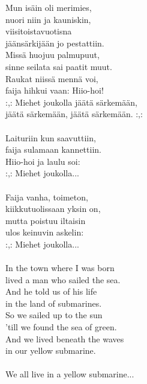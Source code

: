 
Mun isäin oli merimies, \\ nuori niin ja kauniskin, \\ viisitoistavuotisna \\ jäänsärkijään jo pestattiin. \\ Missä huojuu palmupuut, \\ sinne seilata sai paatit muut. \\ Raukat niissä mennä voi, \\ faija hihkui vaan: Hiio-hoi! \\ :,: Miehet joukolla jäätä särkemään, \\ jäätä särkemään, jäätä särkemään. :,: \\ \hspace{10mm} \\ Laituriin kun saavuttiin, \\ faija sulamaan kannettiin. \\ Hiio-hoi ja laulu soi: \\ :,: Miehet joukolla... \\ \hspace{10mm} \\ Faija vanha, toimeton, \\ kiikkutuolissaan yksin on, \\ mutta poistuu iltaisin \\ ulos keinuvin askelin: \\ :,: Miehet joukolla... \\ \hspace{10mm} \\ In the town where I was born \\ lived a man who sailed the sea. \\ And he told us of his life \\ in the land of submarines. \\ So we sailed up to the sun \\ 'till we found the sea of green. \\ And we lived beneath the waves \\ in our yellow submarine. \\ \hspace{10mm} \\ We all live in a yellow submarine...